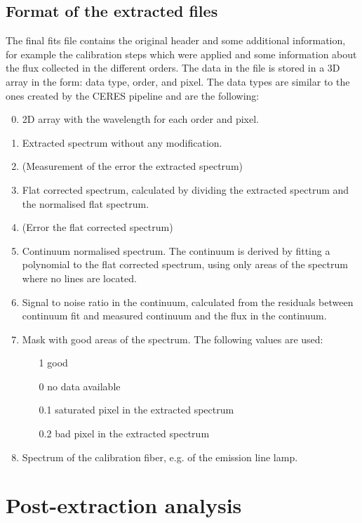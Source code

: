 \documentclass[10pt,a4paper]{article}
\begin{document}
\subsection{Format of the extracted files}

The final fits file contains the original header and some additional information, for example the calibration steps which were applied and some information about the flux collected in the different orders. The data in the file is stored in a 3D array in the form: data type, order, and pixel. The data types are similar to the ones created by the CERES pipeline and are the following:
\begin{enumerate}
  \setcounter{enumi}{-1}
  \item 2D array with the wavelength for each order and pixel.
  \item Extracted spectrum without any modification.
  \item (Measurement of the error the extracted spectrum)
  \item Flat corrected spectrum, calculated by dividing the extracted spectrum and the normalised flat spectrum.
  \item (Error the flat corrected spectrum)
  \item Continuum normalised spectrum. The continuum is derived by fitting a polynomial to the flat corrected spectrum, using only areas of the spectrum where no lines are located. 
  \item Signal to noise ratio in the continuum, calculated from the residuals between continuum fit and measured continuum and the flux in the continuum.
  \item Mask with good areas of the spectrum. The following values are used:
  \begin{itemize}
    \item[1] good
    \item[0] no data available
    \item[0.1] saturated pixel in the extracted spectrum
    \item[0.2] bad pixel in the extracted spectrum
  \end{itemize}
  \item Spectrum of the calibration fiber, e.g. of the emission line lamp.
\end{enumerate}




\newpage
\section{Post-extraction analysis}
\end{document}
